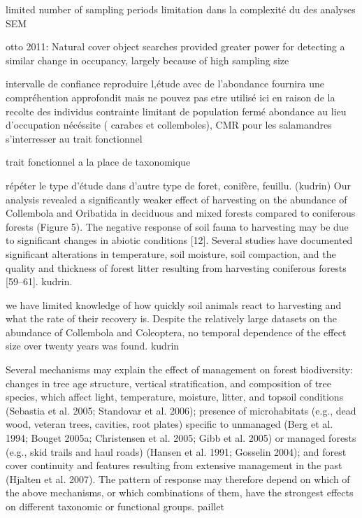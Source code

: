   limited number of sampling periods
  limitation dans la complexité du des analyses SEM

  otto 2011:
  Natural cover object searches provided greater power for detecting a similar change in occupancy, largely because of high sampling size

    intervalle de confiance
  reproduire l,étude avec de l'abondance fournira une compréhention approfondit mais ne pouvez pas etre utilisé ici en raison de la recolte des individus
  contrainte limitant de population fermé
  abondance au lieu d'occupation nécéssite ( carabes et collemboles), CMR pour les salamandres
  s'interresser au trait fonctionnel 

  trait fonctionnel a la place de taxonomique


  répéter le type d'étude dans d'autre type de foret, conifère, feuillu. (kudrin)
  Our analysis revealed a significantly weaker effect of harvesting on the abundance of Collembola and Oribatida in deciduous and mixed forests compared to coniferous forests (Figure 5). The negative response of soil fauna to harvesting may be due to significant changes in abiotic conditions [12]. Several studies have documented significant alterations in temperature, soil moisture, soil compaction, and the quality and thickness of forest litter resulting from harvesting coniferous forests [59–61]. kudrin.

  we have limited knowledge of how quickly soil animals react to harvesting and what the rate of their recovery is.
  Despite the relatively large datasets on the abundance of Collembola and Coleoptera, no temporal dependence of the effect size over twenty years was found. kudrin


  Several mechanisms may explain the effect of management on forest biodiversity: changes in tree age structure, vertical stratification, and composition of tree species, which affect light, temperature, moisture, litter, and topsoil conditions (Sebastia et al. 2005; Standovar et al. 2006); presence of microhabitats (e.g., dead wood, veteran trees, cavities, root plates) specific to unmanaged (Berg et al. 1994; Bouget 2005a; Christensen et al. 2005; Gibb et al. 2005) or managed forests (e.g., skid trails and haul roads) (Hansen et al. 1991; Gosselin 2004); and forest cover continuity and features resulting from extensive management in the past (Hjalten et al. 2007). The pattern of response may therefore depend on which of the above mechanisms, or which combinations of them, have the strongest effects on different taxonomic or functional groups. paillet 


